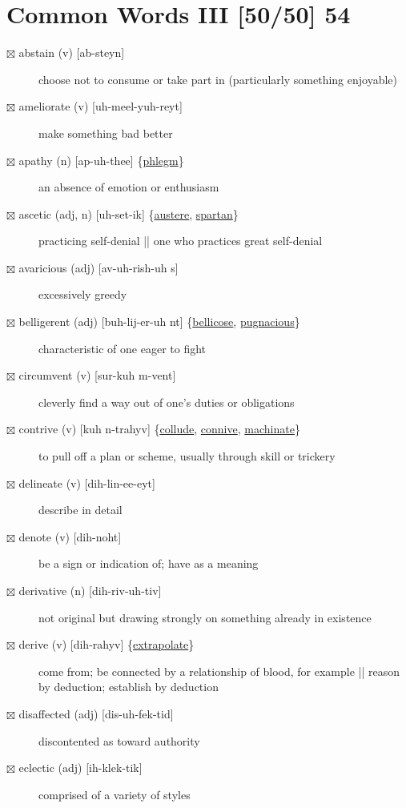 \documentclass[11pt]{article}
\begin{document}
\section{Common Words III [50/50] 54}
\label{sec:orgb375a1c}
\begin{description}
\item[{$\boxtimes$ \label{orge3e83e1} abstain (v) [ab-steyn]}] choose not to consume or take part in (particularly something enjoyable)
\item[{$\boxtimes$ \label{org9035ef9}ameliorate (v) [uh-meel-yuh-reyt]}] make something bad better
\item[{$\boxtimes$ \label{org957a154}apathy (n) [ap-uh-thee] \{\hyperref[orgc64d99a]{phlegm}\}}] an absence of emotion or enthusiasm
\item[{$\boxtimes$ \label{org0c3a606} \label{org219adb4}ascetic (adj, n) [uh-set-ik] \{\hyperref[orgc3d1739]{austere}, \hyperref[orgafdcbd2]{spartan}\}}] practicing self-denial || one who practices great self-denial
\item[{$\boxtimes$ avaricious (adj) [av-uh-rish-uh s]}] excessively greedy
\item[{$\boxtimes$ \label{org16afac9}belligerent (adj) [buh-lij-er-uh nt] \{\hyperref[orge39b955]{bellicose}, \hyperref[org20a75ac]{pugnacious}\}}] characteristic of one eager to fight
\item[{$\boxtimes$ circumvent (v) [sur-kuh m-vent]}] cleverly find a way out of one's duties or obligations
\item[{$\boxtimes$ \label{org00c2b28}contrive (v) [kuh n-trahyv] \{\hyperref[org361c5c0]{collude}, \hyperref[org035e640]{connive}, \hyperref[org1de71f4]{machinate}\}}] to pull off a plan or scheme, usually through skill or trickery
\item[{$\boxtimes$ delineate (v) [dih-lin-ee-eyt]}] describe in detail
\item[{$\boxtimes$ \label{org9f275c9} denote (v) [dih-noht]}] be a sign or indication of; have as a meaning
\item[{$\boxtimes$ derivative (n) [dih-riv-uh-tiv]}] not original but drawing strongly on something already in existence
\item[{$\boxtimes$ \label{org1f5d1d0}derive (v) [dih-rahyv] \{\hyperref[org5f38148]{extrapolate}\}}] come from; be connected by a relationship of blood, for example || reason by deduction; establish by deduction
\item[{$\boxtimes$ disaffected (adj) [dis-uh-fek-tid]}] discontented as toward authority
\item[{$\boxtimes$ eclectic (adj) [ih-klek-tik]}] comprised of a variety of styles

\end{description}
\end{document}
